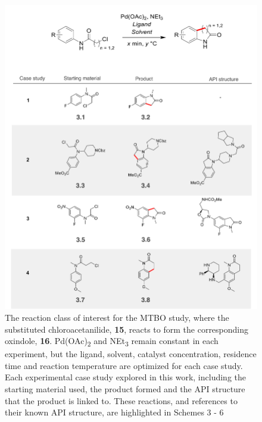 \begin{figure}
    \centering
    \includegraphics[width=\textwidth]{gfx/Chapter04/ch_activation_case_studies.png}
    \caption{ The reaction class of interest for the MTBO study, where the substituted chloroacetanilide, \textbf{15}, reacts to form the corresponding oxindole, \textbf{16}. Pd(OAc)\textsubscript{2} and NEt\textsubscript{3} remain constant in each experiment, but the ligand, solvent, catalyst concentration, residence time and reaction temperature are optimized for each case study. Each experimental case study explored in this work, including the starting material used, the product formed and the API structure that the product is linked to. These reactions, and references to their known API structure, are highlighted in Schemes 3 - 6}
    \label{fig:ch_activation}
\end{figure}

